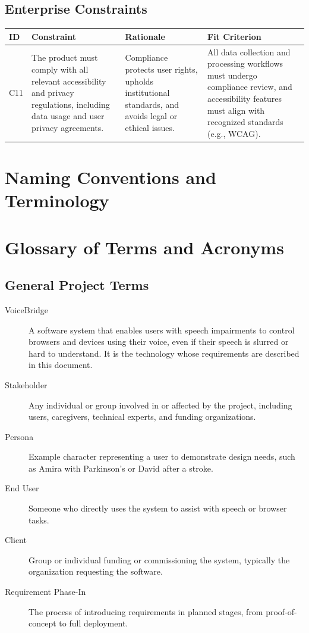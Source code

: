 \documentclass[11pt]{article}
\begin{document}
\subsection{Enterprise Constraints}

\begin{tabularx}{\textwidth}{p{1cm}X X X}
\toprule
\textbf{ID} & \textbf{Constraint} & \textbf{Rationale} & \textbf{Fit Criterion} \\
\midrule
C11 & The product must comply with all relevant accessibility and privacy regulations, including data usage and user privacy agreements. & Compliance protects user rights, upholds institutional standards, and avoids legal or ethical issues. & All data collection and processing workflows must undergo compliance review, and accessibility features must align with recognized standards (e.g., WCAG). \\
\bottomrule
\end{tabularx}

\section{Naming Conventions and Terminology}
\section*{Glossary of Terms and Acronyms}

\subsection*{General Project Terms}

\begin{description}
  \item[VoiceBridge] A software system that enables users with speech impairments to control browsers and devices using their voice, even if their speech is slurred or hard to understand. It is the technology whose requirements are described in this document.
  \item[Stakeholder] Any individual or group involved in or affected by the project, including users, caregivers, technical experts, and funding organizations.
  \item[Persona] Example character representing a user to demonstrate design needs, such as Amira with Parkinson’s or David after a stroke.
  \item[End User] Someone who directly uses the system to assist with speech or browser tasks.
  \item[Client] Group or individual funding or commissioning the system, typically the organization requesting the software.
  \item[Requirement Phase-In] The process of introducing requirements in planned stages, from proof-of-concept to full deployment.
\end{description}
\end{document}
